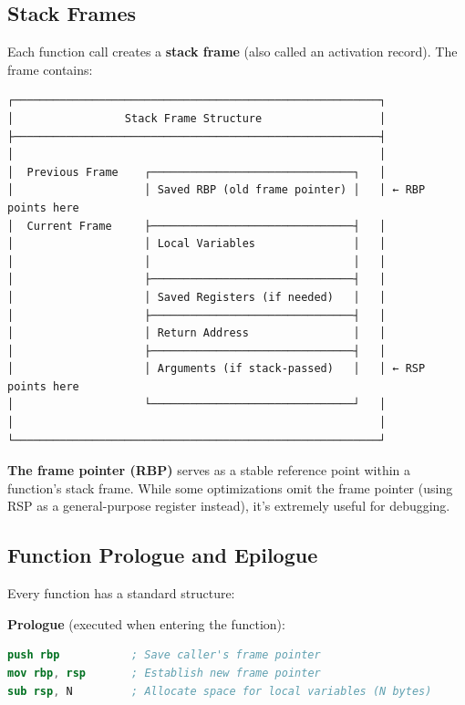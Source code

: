 \subsection{Stack Frames}

Each function call creates a \textbf{stack frame} (also called an activation record). The frame contains:

\begin{verbatim}
┌────────────────────────────────────────────────────────┐
│                 Stack Frame Structure                  │
├────────────────────────────────────────────────────────┤
│                                                        │
│  Previous Frame    ┌───────────────────────────────┐   │
│                    │ Saved RBP (old frame pointer) │   │ ← RBP points here
│  Current Frame     ├───────────────────────────────┤   │
│                    │ Local Variables               │   │
│                    │                               │   │
│                    ├───────────────────────────────┤   │
│                    │ Saved Registers (if needed)   │   │
│                    ├───────────────────────────────┤   │
│                    │ Return Address                │   │
│                    ├───────────────────────────────┤   │
│                    │ Arguments (if stack-passed)   │   │ ← RSP points here
│                    └───────────────────────────────┘   │
│                                                        │
└────────────────────────────────────────────────────────┘
\end{verbatim}

\textbf{The frame pointer (RBP)} serves as a stable reference point within a function's stack frame. While some optimizations omit the frame pointer (using RSP as a general-purpose register instead), it's extremely useful for debugging.

\subsection{Function Prologue and Epilogue}

Every function has a standard structure:

\textbf{Prologue} (executed when entering the function):
\begin{lstlisting}[language=nasm,basicstyle=\ttfamily\small]
push rbp           ; Save caller's frame pointer
mov rbp, rsp       ; Establish new frame pointer
sub rsp, N         ; Allocate space for local variables (N bytes)
\end{lstlisting}

